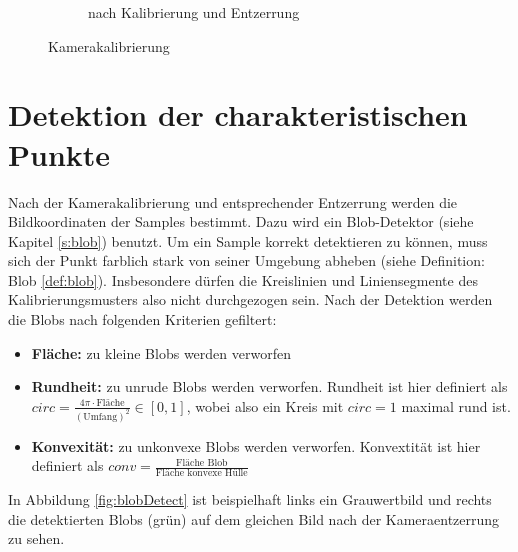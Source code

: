 \begin{figure}[!htb]
\begin{subfigure}{.5\textwidth}
	\caption{nach Kalibrierung und Entzerrung}
	\label{fig:calibUndist}
\end{subfigure}
\caption{Kamerakalibrierung}
\label{fig:calib}
\end{figure}


\section{Detektion der charakteristischen Punkte}

Nach der Kamerakalibrierung und entsprechender Entzerrung werden die Bildkoordinaten der Samples bestimmt. Dazu wird ein Blob-Detektor (siehe Kapitel \ref{s:blob}) benutzt. 
Um ein Sample korrekt detektieren zu können, muss sich der Punkt farblich stark von seiner Umgebung abheben (siehe Definition: Blob \ref{def:blob}). Insbesondere dürfen die Kreislinien und Liniensegmente des Kalibrierungsmusters also nicht durchgezogen sein. Nach der Detektion werden die Blobs nach folgenden Kriterien gefiltert:

\begin{itemize}
	\item \textbf{Fläche:} zu kleine Blobs werden verworfen
	\item \textbf{Rundheit:} zu unrude Blobs werden verworfen. Rundheit ist hier definiert als $circ = \frac{4\pi\cdot \textrm{Fläche}}{\left(\textrm{Umfang}\right)^2}\in[0,1]$, wobei also ein Kreis mit $circ = 1$ maximal rund ist. 
	\item  \textbf{Konvexität:} zu unkonvexe Blobs werden verworfen. Konvextität ist hier definiert als $conv = \frac{\textrm{Fläche Blob}}{\textrm{Fläche konvexe Hülle}}$
\end{itemize}

In Abbildung \ref{fig:blobDetect} ist beispielhaft links ein Grauwertbild und rechts die detektierten Blobs (grün) auf dem gleichen Bild nach der Kameraentzerrung zu sehen.



